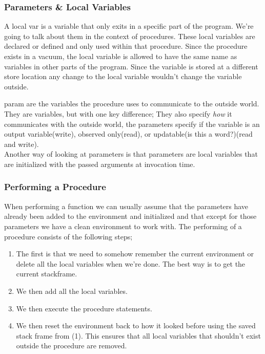 \documentclass[tikz, border=5mm]{article}
\begin{document}
    \subsubsection{Parameters \& Local Variables}
    A \gls{local var} is a variable that only exits in a specific part of the program. We're going to talk about them in the context of procedures.
    These local variables are declared or defined and only used within that procedure.
    Since the procedure exists in a vacuum, the local variable is allowed to have the same name as variables in other parts of the program. 
    Since the variable is stored at a different store location any change to the local variable wouldn't change the variable outside.

    \gls{param} are the variables the procedure uses to communicate to the outside world. They are variables, but with one key difference;
    They also specify \textit{how} it communicates with the outside world, the parameters specify if the variable is an output variable(write), observed only(read), or updatable(is this a word?)(read and write).\\
    Another way of looking at parameters is that parameters are local variables that are initialized with the passed arguments at invocation time.
    \subsubsection{Performing a Procedure}
        When performing a function we can usually assume that the parameters have already been added to the environment and initialized and that except for those parameters we have a clean
        environment to work with.
        The performing of a procedure consists of the following steps;
        \begin{enumerate}
            \item The first is that we need to somehow remember the current environment or delete all the local variables when we're done.
                The best way is to get the current \gls{stackframe}.
            \item We then add all the local variables.
            \item We then execute the procedure statements.
            \item We then reset the environment back to how it looked before using the saved stack frame from (1). This ensures that all local variables
                that shouldn't exist outside the procedure are removed. 
        \end{enumerate}
\end{document}

